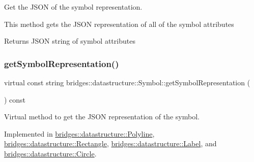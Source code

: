 Get the J\+S\+ON of the symbol representation. 

This method gets the J\+S\+ON representation of all of the symbol attributes

\begin{DoxyReturn}{Returns}
J\+S\+ON string of symbol attributes 
\end{DoxyReturn}
\mbox{\label{classbridges_1_1datastructure_1_1_symbol_a8044b3da559dcd9de8510ae339f126c8}} 
\subsubsection{\texorpdfstring{get\+Symbol\+Representation()}{getSymbolRepresentation()}}
{\footnotesize\ttfamily virtual const string bridges\+::datastructure\+::\+Symbol\+::get\+Symbol\+Representation (\begin{DoxyParamCaption}{ }\end{DoxyParamCaption}) const\hspace{0.3cm}{\ttfamily [pure virtual]}}



Virtual method to get the J\+S\+ON representation of the symbol. 



Implemented in \hyperlink{classbridges_1_1datastructure_1_1_polyline_a176c06400a3b105fa651c69891381201}{bridges\+::datastructure\+::\+Polyline}, \hyperlink{classbridges_1_1datastructure_1_1_rectangle_ada89ed40d2515a3518084f5460ba8dac}{bridges\+::datastructure\+::\+Rectangle}, \hyperlink{classbridges_1_1datastructure_1_1_label_aa3b7c9e5630ecc8a2534e6db2a220e90}{bridges\+::datastructure\+::\+Label}, and \hyperlink{classbridges_1_1datastructure_1_1_circle_a796c88ccb8c5529d45aa7271a34fa3fe}{bridges\+::datastructure\+::\+Circle}.

\mbox{\label{classbridges_1_1datastructure_1_1_symbol_ad40678e04bae69b4c03881148678e71e}} 
